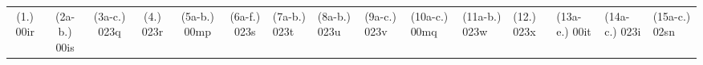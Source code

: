 \begin{eocexercises}{}
\begin{enumerate}[itemsep=5pt, label=\textbf{\arabic*}. ]
  \end{enumerate}
\practiceinfo

\begin{tabular}{cccccc}
    (1.) 00ir& (2a-b.) 00is& (3a-c.) 023q & (4.) 023r & (5a-b.) 00mp &
    (6a-f.) 023s & (7a-b.) 023t & (8a-b.) 023u & (9a-c.) 023v & (10a-c.) 00mq &
    (11a-b.) 023w & (12.) 023x & (13a-e.) 00it &(14a-c.) 023i & (15a-c.) 02sn \\
  \end{tabular}
\end{eocexercises}

